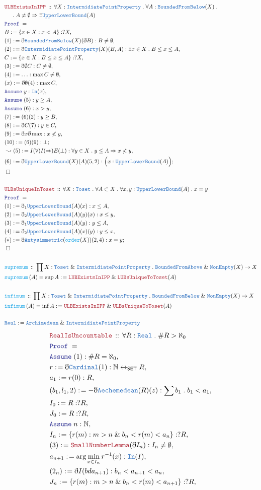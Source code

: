 \documentclass[12pt]{scrartcl}
\newcommand{\TYPE}[1]{\textcolor{NavyBlue}{\mathtt{#1}}}
\newcommand{\FUNC}[1]{\textcolor{Cerulean}{\mathtt{#1}}}
\newcommand{\LOGIC}[1]{\textcolor{Blue}{\mathtt{#1}}}
\newcommand{\THM}[1]{\textcolor{Maroon}{\mathtt{#1}}}
\renewcommand{\.}{\; . \;}
\newcommand{\de}{: \kern 0.1pc =}
\newcommand{\Act}[1]{\left( #1 \right)}
\newcommand{\Theorem}[2]{& \THM{#1} \, :: \, #2 \\ & \Proof = \\ }
\newcommand{\DeclareFunc}[2]{& \FUNC{#1} \, :: \, #2 \\}
\newcommand{\DefineNamedFunc}[4]{&  \FUNC{#1}\Act{#2} = #3 \de #4 \\}
\newcommand{\NewLine}{\\ & \kern 1pc}
\newcommand{\Page}[1]{ \begin{align*} #1 \end{align*}   }
\newcommand{ \bd }{ \ByDef }
\renewcommand{\And}{\; \& \;}
\newcommand{\Nat}{\mathbb{N} }
\newcommand{\ToBij}{\leftrightarrow}
\newcommand{\Say}[3]{& #1 \de #2 : #3, \\}
\newcommand{\Conclude}[3]{& #1 \de #2 : #3; \\}
\newcommand{\Derive}[3]{& \leadsto #1 \de #2 : #3, \\}
\newcommand{\Assume}[2]{& \LOGIC{Assume} \;#1 : #2, \\}
\newcommand{\QED}{\; \square}
\newcommand{\EndProof}{& \QED \\}
\newcommand{\ByDef}{\eth}
\newcommand{\Proof}{\LOGIC{Proof} \; }
\newcommand{\IPP}{\TYPE{IntermidiatePointProperty}}
\newcommand{\ULB}{\TYPE{UpperLowerBound}}
\begin{document}
\Page{
	\Theorem{ULBExistsInIPP}{ \forall X : \IPP \. 
		\forall A : \TYPE{BoundedFromBelow}(X) \. 
		 \NewLine  \. A \neq \emptyset \Rightarrow \exists \ULB(A)  }
	\Say{B}{\{ x \in X : x < A  \}}{?X}
	\Say{(1)}{\bd \TYPE{BoundedFromBelow}(X)(\bd B)}{ B \neq \emptyset  }
	\Say{(2)}{ \bd \IPP(X)(B,A) }{ \exists x \in X \. B \le x \le A  }
	\Say{C}{ \{ x \in X : B \le x \le A \}  }{?X}
	\Say{(3)}{  \bd \emptyset C   }{C \neq \emptyset}
	\Say{(4)}{\ldots}{ \max C \neq \emptyset  }
	\Say{(x)}{ \bd \emptyset(4) }{ \max C}
	\Assume{y}{\TYPE{In}(x)}
	\Assume{(5)}{ y \ge A}
	\Assume{(6)}{ x > y}
	\Say{(7)}{(6)(2)}{ y \ge B}
	\Say{(8)}{ \bd C (7)      }{  y \in C  }
	\Say{(9)}{ \bd x\bd \max  }{ x \not < y  }
	\Conclude{(10)}{(6)(9)}{\bot}
	\Derive{(5)}{I(\forall)I(\Rightarrow) E(\bot)}{\forall y \in X \. y \le A \Rightarrow x \not < y}
	\Conclude{(6)}{\bd \ULB(X)(A)(5,2) }{ \Big( x : \ULB(A) \Big) }
	\EndProof
	\\
	\Theorem{ULBsUniqueInToset}{\forall X : \TYPE{Toset} \. \forall A \subset X \. \forall x,y : \ULB(A) \. x = y}
	\Say{(1)}{ \bd_1 \ULB(A)(x)     }{ x \le A  }
	\Say{(2)}{ \bd_2 \ULB(A)(y)(x)  }{ x \le y  }
	\Say{(3)}{ \bd_1 \ULB(A)(y)     }{ y \le A  }
	\Say{(4)}{ \bd_2 \ULB(A)(x)(y)  }{ y \le x  }
	\Conclude{(*)}{ \bd \TYPE{Antysimmetric}(\FUNC{order}(X))(2,4)    }{ x = y}
	\EndProof
	\\
	\DeclareFunc{supremum}{ \prod X : \TYPE{Toset} \And \IPP \. \TYPE{BoundedFromAbove} \And \TYPE{NonEmpty}(X) \to X}
	\DefineNamedFunc{supremum}{ A }{\sup A }{ \THM{LUBExistsInIPP} \And \THM{LUBsUniqueToToset}(A) }
	\\
	\DeclareFunc{infimum}{\prod X : \TYPE{Toset} \And \IPP \. \TYPE{BoundedFromBelow} \And \TYPE{NonEmpty}(X) \to X}
	\DefineNamedFunc{infimum}{A}{\inf A}{\THM{ULBExistsInIPP} \And \THM{ULBsUniqueToToset}(A)}
	\\
	&\TYPE{Real} \de \TYPE{Archimedean}  \And \IPP \\
}\Page{
	\Theorem{RealIsUncountable}{ \forall R : \TYPE{Real} \. \#  R > \aleph_0 }
	\Assume{(1)}{\# R = \aleph_0}
	\Say{r}{\bd \TYPE{Cardinal}(1)}{ \Nat \ToBij_{\mathsf{SET}} R  }
	\Say{a_1}{ r(0) }{R}
	\Say{(b_1,l_1,2)}{-\bd\TYPE{Aechemedean}(R)(z)}{\sum b_1  \. b_1 < a_1}
	\Say{I_0}{R}{?R}
	\Say{J_0}{R}{?R}
	\Assume{n}{\Nat}
	\Say{I_n}{  \{  r(m)  :  m > n \And   b_n < r(m) < a_n    \}   }{ ?R  }
	\Say{(3)}{\THM{SmallNumberLemma}(\bd I_n)}{I_n \neq \emptyset}
	\Say{ a_{n+1}  }{\arg \min_{x \in I_n} r^{-1}(x)}{\TYPE{In}(I)}
	\Say{ (2_n)   }{ \bd I (bd a_{n + 1})   }{ b_n  <   a_{n + 1} < a_n}
	\Say{J_n}{  \{  r(m)  :  m > n \And   b_n < r(m) < a_{n + 1}  \}   }{ ?R  }
}
\end{document}

